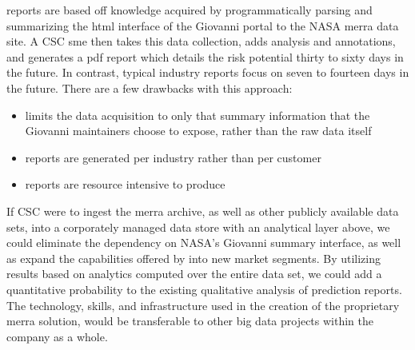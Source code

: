 \climatedge reports are based off knowledge acquired by programmatically parsing and summarizing the \gls{html} interface of the Giovanni\cite{giovanni} portal to the NASA \gls{merra} data site.  A \textsc{CSC} \gls{sme} then takes this data collection, adds analysis and annotations, and generates a \gls{pdf} report which details the risk potential thirty to sixty days in the future. In contrast, typical industry reports focus on seven to fourteen days in the future. There are a few drawbacks with this approach:
\begin{itemize}
    \item{limits the data acquisition to only that summary information that the Giovanni  maintainers choose to expose, rather than the raw data itself}
    \item{reports are generated per industry rather than per customer}
    \item{reports are resource intensive to produce}
\end{itemize}



If \textsc{CSC} were to ingest the \gls{merra} archive, as well as other publicly available data sets, into a corporately managed data store with an analytical layer above, we could eliminate the dependency on NASA's Giovanni summary interface, as well as expand the capabilities offered by \climatedge into new market segments. By utilizing results based on analytics computed over the entire data set, we could add a quantitative probability to the existing qualitative analysis of \climatedge prediction reports. The technology, skills, and infrastructure used in the creation of the proprietary \gls{merra} solution, would be transferable to other big data projects within the company as a whole.\\
 



